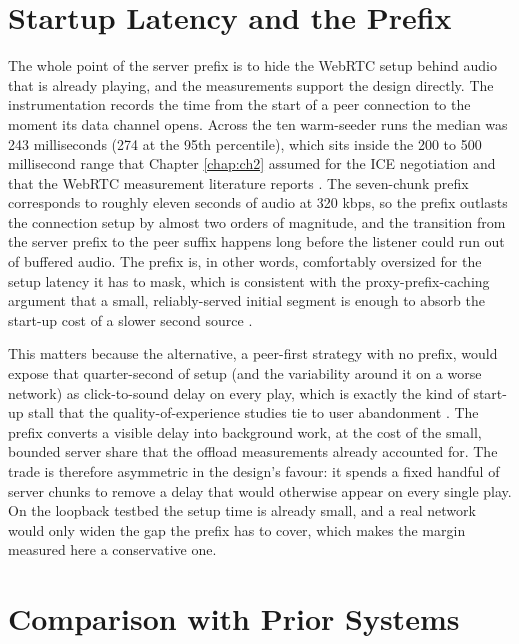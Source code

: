 \section{Startup Latency and the Prefix}
\label{sec:eval-startup}

\indent \par The whole point of the server prefix is to hide the WebRTC setup behind audio that is already playing, and the measurements support the design directly. The instrumentation records the time from the start of a peer connection to the moment its data channel opens. Across the ten warm-seeder runs the median was 243 milliseconds (274 at the 95th percentile), which sits inside the 200 to 500 millisecond range that Chapter \ref{chap:ch2} assumed for the ICE negotiation and that the WebRTC measurement literature reports \cite{webrtc_testing}. The seven-chunk prefix corresponds to roughly eleven seconds of audio at 320 kbps, so the prefix outlasts the connection setup by almost two orders of magnitude, and the transition from the server prefix to the peer suffix happens long before the listener could run out of buffered audio. The prefix is, in other words, comfortably oversized for the setup latency it has to mask, which is consistent with the proxy-prefix-caching argument that a small, reliably-served initial segment is enough to absorb the start-up cost of a slower second source \cite{prefix_caching}.

\par This matters because the alternative, a peer-first strategy with no prefix, would expose that quarter-second of setup (and the variability around it on a worse network) as click-to-sound delay on every play, which is exactly the kind of start-up stall that the quality-of-experience studies tie to user abandonment \cite{quality_impact}. The prefix converts a visible delay into background work, at the cost of the small, bounded server share that the offload measurements already accounted for. The trade is therefore asymmetric in the design's favour: it spends a fixed handful of server chunks to remove a delay that would otherwise appear on every single play. On the loopback testbed the setup time is already small, and a real network would only widen the gap the prefix has to cover, which makes the margin measured here a conservative one.

\section{Comparison with Prior Systems}
\label{sec:eval-comparison}

